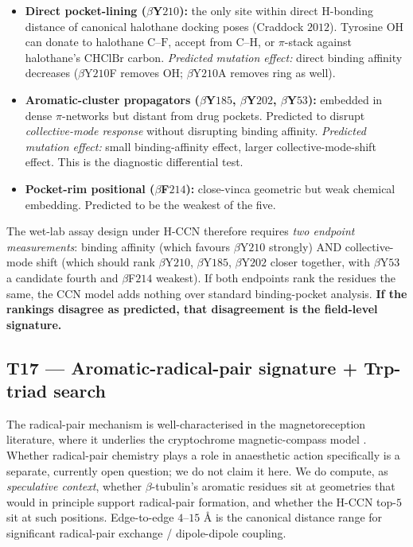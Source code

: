 \documentclass[11pt,a4paper]{article}
\begin{document}
\begin{itemize}\itemsep0pt
  \item \textbf{Direct pocket-lining ($\beta$Y$210$):} the only site
    within direct H-bonding distance of canonical halothane docking
    poses (Craddock $2012$). Tyrosine $\mathrm{OH}$ can donate to
    halothane $\mathrm{C}$--$\mathrm{F}$, accept from
    $\mathrm{C}$--$\mathrm{H}$, or $\pi$-stack against halothane's
    $\mathrm{CHClBr}$ carbon. \emph{Predicted mutation effect:}
    direct binding affinity decreases ($\beta$Y$210$F removes OH;
    $\beta$Y$210$A removes ring as well).
  \item \textbf{Aromatic-cluster propagators ($\beta$Y$185$,
    $\beta$Y$202$, $\beta$Y$53$):} embedded in dense $\pi$-networks
    but distant from drug pockets. Predicted to disrupt
    \emph{collective-mode response} without disrupting binding
    affinity. \emph{Predicted mutation effect:} small binding-affinity
    effect, larger collective-mode-shift effect. This is the
    diagnostic differential test.
  \item \textbf{Pocket-rim positional ($\beta$F$214$):} close-vinca
    geometric but weak chemical embedding. Predicted to be the
    weakest of the five.
\end{itemize}

The wet-lab assay design under H-CCN therefore requires \emph{two
endpoint measurements}: binding affinity (which favours $\beta$Y$210$
strongly) AND collective-mode shift (which should rank
$\beta$Y$210$, $\beta$Y$185$, $\beta$Y$202$ closer together, with
$\beta$Y$53$ a candidate fourth and $\beta$F$214$ weakest). If both
endpoints rank the residues the same, the CCN model adds nothing
over standard binding-pocket analysis. \textbf{If the rankings
disagree as predicted, that disagreement is the field-level signature.}

\subsection{\textsf{T17} --- Aromatic-radical-pair signature + Trp-triad search}\label{ssec:t17}

The radical-pair mechanism is well-characterised in the magnetoreception
literature, where it underlies the cryptochrome magnetic-compass model
\cite{HoreMouritsen2016}. Whether radical-pair chemistry plays a role
in anaesthetic action specifically is a separate, currently
open question; we do not claim it here. We do compute, as
\emph{speculative context}, whether $\beta$-tubulin's aromatic
residues sit at geometries that would in principle support radical-pair
formation, and whether the H-CCN top-$5$ sit at such positions.
Edge-to-edge $4$--$15$ \AA{} is the canonical distance range for
significant radical-pair exchange / dipole-dipole coupling.
\end{document}
